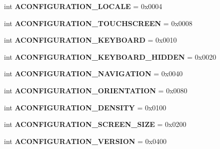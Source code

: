\begin{DoxyCompactItemize}
int {\bfseries A\+C\+O\+N\+F\+I\+G\+U\+R\+A\+T\+I\+O\+N\+\_\+\+L\+O\+C\+A\+LE} = 0x0004
\item 
\mbox{\label{classconfiguration_1_1AConfiguration_ada67d01d1a701a702388cc83c2262cd2}} 
int {\bfseries A\+C\+O\+N\+F\+I\+G\+U\+R\+A\+T\+I\+O\+N\+\_\+\+T\+O\+U\+C\+H\+S\+C\+R\+E\+EN} = 0x0008
\item 
\mbox{\label{classconfiguration_1_1AConfiguration_adf5d9e058ce272c0f2694b6a9e3b5f8a}} 
int {\bfseries A\+C\+O\+N\+F\+I\+G\+U\+R\+A\+T\+I\+O\+N\+\_\+\+K\+E\+Y\+B\+O\+A\+RD} = 0x0010
\item 
\mbox{\label{classconfiguration_1_1AConfiguration_ad3b490f7d1d5a09e2ee2ef36facb819c}} 
int {\bfseries A\+C\+O\+N\+F\+I\+G\+U\+R\+A\+T\+I\+O\+N\+\_\+\+K\+E\+Y\+B\+O\+A\+R\+D\+\_\+\+H\+I\+D\+D\+EN} = 0x0020
\item 
\mbox{\label{classconfiguration_1_1AConfiguration_a1b24aee62ef2a84a561b3fca21e87bc0}} 
int {\bfseries A\+C\+O\+N\+F\+I\+G\+U\+R\+A\+T\+I\+O\+N\+\_\+\+N\+A\+V\+I\+G\+A\+T\+I\+ON} = 0x0040
\item 
\mbox{\label{classconfiguration_1_1AConfiguration_a508c9492e9f9c86ddc98b225495711ef}} 
int {\bfseries A\+C\+O\+N\+F\+I\+G\+U\+R\+A\+T\+I\+O\+N\+\_\+\+O\+R\+I\+E\+N\+T\+A\+T\+I\+ON} = 0x0080
\item 
\mbox{\label{classconfiguration_1_1AConfiguration_a9d28d4540ca9cebb3bcb1bd7ad011bdd}} 
int {\bfseries A\+C\+O\+N\+F\+I\+G\+U\+R\+A\+T\+I\+O\+N\+\_\+\+D\+E\+N\+S\+I\+TY} = 0x0100
\item 
\mbox{\label{classconfiguration_1_1AConfiguration_ab64b9f01c04cf1dbc99727326c52a4f2}} 
int {\bfseries A\+C\+O\+N\+F\+I\+G\+U\+R\+A\+T\+I\+O\+N\+\_\+\+S\+C\+R\+E\+E\+N\+\_\+\+S\+I\+ZE} = 0x0200
\item 
\mbox{\label{classconfiguration_1_1AConfiguration_a862b4d7a4207c4994c9dfb5084c61a7e}} 
int {\bfseries A\+C\+O\+N\+F\+I\+G\+U\+R\+A\+T\+I\+O\+N\+\_\+\+V\+E\+R\+S\+I\+ON} = 0x0400

\end{DoxyCompactItemize}
